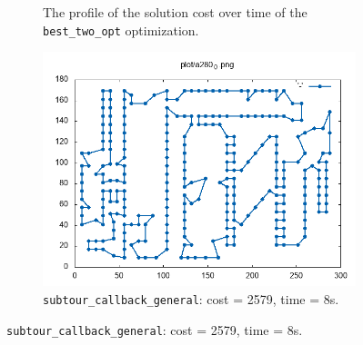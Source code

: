 \begin{figure}[!h]
\begin{subfigure}{.5\columnwidth}
		\caption{The profile of the solution cost over time of the \texttt{best\_two\_opt} optimization.}
		\label{fig:lb_greedy_best_two_opt_a280}
	\end{subfigure}
	\begin{subfigure}{.5\columnwidth}
		\centering
		\includegraphics[width=0.9\columnwidth]{../res/a280_0.png}
		\caption{\texttt{subtour\_callback\_general}: cost = 2579, time = 8s.}
		\label{fig:a280_0}
	\end{subfigure}
\end{figure}


